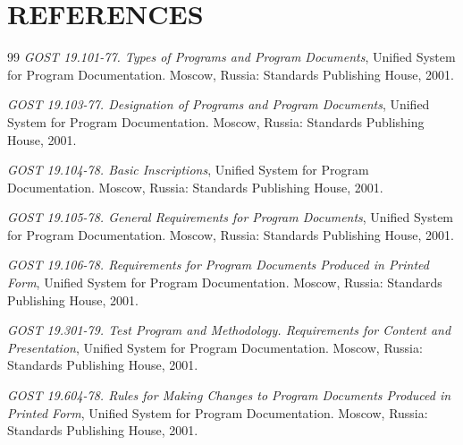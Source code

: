 \documentclass[12pt,a4paper]{extarticle}
\begin{document}
\clearpage
\pagestyle{appendix}

\section*{REFERENCES}

\renewcommand{\refname}{}
\begin{thebibliography}{99}
\emph{GOST 19.101-77. Types of Programs and Program Documents}, Unified System for Program Documentation. Moscow, Russia: Standards Publishing House, 2001.

\emph{GOST 19.103-77. Designation of Programs and Program Documents}, Unified System for Program Documentation. Moscow, Russia: Standards Publishing House, 2001.

\emph{GOST 19.104-78. Basic Inscriptions}, Unified System for Program Documentation. Moscow, Russia: Standards Publishing House, 2001.

\emph{GOST 19.105-78. General Requirements for Program Documents}, Unified System for Program Documentation. Moscow, Russia: Standards Publishing House, 2001.

\emph{GOST 19.106-78. Requirements for Program Documents Produced in Printed Form}, Unified System for Program Documentation. Moscow, Russia: Standards Publishing House, 2001.

\emph{GOST 19.301-79. Test Program and Methodology. Requirements for Content and Presentation}, Unified System for Program Documentation. Moscow, Russia: Standards Publishing House, 2001.

\emph{GOST 19.604-78. Rules for Making Changes to Program Documents Produced in Printed Form}, Unified System for Program Documentation. Moscow, Russia: Standards Publishing House, 2001.
\end{thebibliography}

\clearpage



\end{document}
